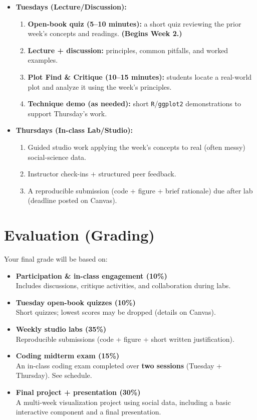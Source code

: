 \documentclass[letterpaper,11pt]{article}
\newcommand{\R}{\texttt{R}}
\newcommand{\compresslist}{
\setlength{\itemsep}{1pt}
\setlength{\parskip}{0pt}
\setlength{\parsep}{0pt}
}
\begin{document}
\begin{itemize}\compresslist
\item \textbf{Tuesdays (Lecture/Discussion):}
\begin{enumerate}\compresslist
\item \textbf{Open-book quiz (5--10 minutes):} a short quiz reviewing the prior week’s concepts and readings. \textbf{(Begins Week 2.)}
\item \textbf{Lecture + discussion:} principles, common pitfalls, and worked examples.
\item \textbf{Plot Find \& Critique (10--15 minutes):} students locate a real-world plot and analyze it using the week’s principles.
\item \textbf{Technique demo (as needed):} short \R/\texttt{ggplot2} demonstrations to support Thursday’s work.
\end{enumerate}

\item \textbf{Thursdays (In-class Lab/Studio):}
\begin{enumerate}\compresslist
\item Guided studio work applying the week’s concepts to real (often messy) social-science data.
\item Instructor check-ins + structured peer feedback.
\item A reproducible submission (code + figure + brief rationale) due after lab (deadline posted on Canvas).
\end{enumerate}
\end{itemize}

\section*{Evaluation (Grading)}
\noindent Your final grade will be based on:

\begin{itemize}
\compresslist
\item \textbf{Participation \& in-class engagement (10\%)}\\
Includes discussions, critique activities, and collaboration during labs.
\item \textbf{Tuesday open-book quizzes (10\%)}\\
Short quizzes; lowest scores may be dropped (details on Canvas).
\item \textbf{Weekly studio labs (35\%)}\\
Reproducible submissions (code + figure + short written justification).
\item \textbf{Coding midterm exam (15\%)}\\
An in-class coding exam completed over \textbf{two sessions} (Tuesday + Thursday). See schedule.
\item \textbf{Final project + presentation (30\%)}\\
A multi-week visualization project using social data, including a basic interactive component and a final presentation.
\end{itemize}
\end{document}

